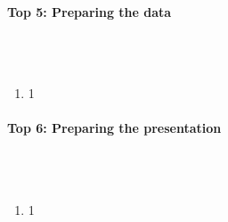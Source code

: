 \documentclass{scrartcl}
\begin{document}
\paragraph{Top 5: Preparing the data}
\hfill \\ \hfill \\
\begin {enumerate}
\item 1
\end {enumerate}

\paragraph{Top 6: Preparing the presentation}
\hfill \\ \hfill \\
\begin {enumerate}
\item 1
\end {enumerate}
\end{document}
